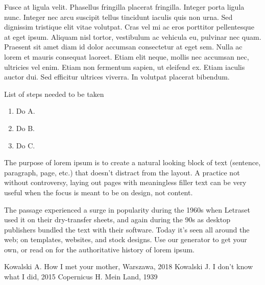 \documentclass[final]{beamer}
\begin{document}
\begin{frame}
\begin{multicols}{3}
Fusce at ligula velit. Phasellus fringilla placerat fringilla. Integer porta ligula nunc. Integer nec arcu suscipit tellus tincidunt iaculis quis non urna.
Sed dignissim tristique elit vitae volutpat. Cras vel mi ac eros porttitor pellentesque at eget ipsum. Aliquam nisl tortor, vestibulum ac vehicula eu, pulvinar nec quam. 
Praesent sit amet diam id dolor accumsan consectetur at eget sem. Nulla ac lorem et mauris consequat laoreet. Etiam elit neque, mollis nec accumsan nec, ultricies vel enim. 
Etiam non fermentum sapien, ut eleifend ex. Etiam iaculis auctor dui. Sed efficitur ultrices viverra. In volutpat placerat bibendum.\cite{hans1}



\begin{table}
{\LARGE{List of steps needed to be taken}}
  \begin{enumerate}
    \item Do A.
    \item Do B.
    \item Do C.
  \end{enumerate}
\end{table}
The purpose of lorem ipsum is to create a natural looking block of text (sentence, paragraph, page, etc.) that doesn't distract from the layout.
A practice not without controversy, laying out pages with meaningless filler text can be very useful when the focus is meant to be on design, not content.
\vspace{.5cm}

The passage experienced a surge in popularity during the 1960s when Letraset used it on their dry-transfer sheets,
and again during the 90s as desktop publishers bundled the text with their software. 
Today it's seen all around the web; on templates, websites, and stock designs. 
Use our generator to get your own, or read on for the authoritative history of lorem ipsum.
\vspace{.4cm}

\small
\begin{thebibliography}{9}
 Kowalski A. How I met your mother, Warszawa, 2018
 Kowalski J. I don't know what I did, 2015
 Copernicus H. Mein Land, 1939
\end{thebibliography}


\end{multicols}
\end{frame}
\end{document}
